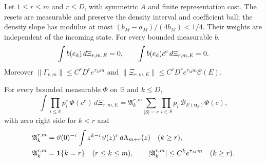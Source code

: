 \begin{lemma}\label{lem:local-operator}
Let $1\le r\le m$ and $r\le D$, with symmetric $A$ and finite
representation cost. The resets are measurable and preserve the
density interval and coefficient ball; the density slope has modulus
at most $(b_M-a_M)/(4b_M)<1/4$. Their weights are independent of
the incoming state. For every bounded measurable $b$,
\begin{equation}\label{eq:LB-operator-annihilation}
 \int b(e_{\rm d})\,d\Xi_{r,m,E}=0,\qquad
 \int b(e_{\rm d})c^e\,d\Xi_{r,m,E}=0.
\end{equation}
Moreover $\|\Gamma_{r,m}\|\le C^rD^re^{\tau_Mm}$ and
$\|\Xi_{r,m,E}\|\le C^rD^re^{\tau_Mm}\mathcal C(E)$.

For every bounded measurable $\Phi$ on $\mathbb B$ and $k\le D$,
\begin{equation}\label{eq:LB-loc-row}
 \int\prod_{i\le k}p_i^e\,\Phi(c^e)\,d\Xi_{r,m,E}
 =\mathfrak A_k^{r,m}\sum_{|S|=r}\prod_{i\in S}p_i\,
                  \mathcal B_{E(\mathbf u_S)}\Phi(c),
\end{equation}
with zero right side for $k<r$ and
\begin{equation}\label{eq:LB-loc-count}
 \begin{aligned}
 \mathfrak A_k^{r,m}&=\vartheta(0)^{-r}
 \int z^{k-r}\vartheta(z)^r\,d\Lambda_{m+r}(z)\quad(k\ge r),\\
 \mathfrak A_k^{r,m}&=\mathbf 1\{k=r\}\quad(r\le k\le m),\qquad
 |\mathfrak A_k^{r,m}|\le C^ke^{\tau_Mm}\quad(k\ge r).
 \end{aligned}
\end{equation}


\end{lemma}
